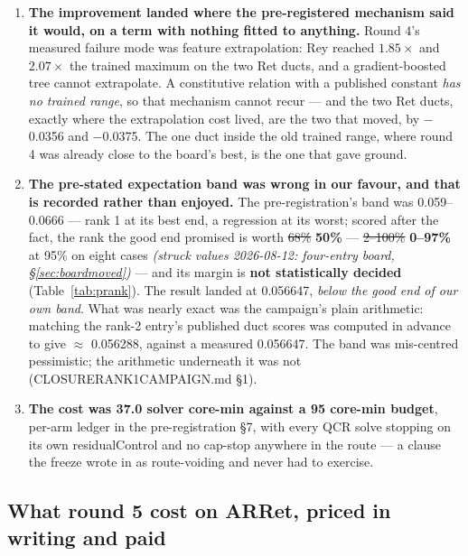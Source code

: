 \documentclass[11pt,a4paper]{article}
\newcommand{\breakus}{\textunderscore\allowbreak}
\newcommand{\code}[1]{{\small\ttfamily\let\_\breakus #1}}
\newcommand{\artifact}[1]{{\footnotesize\ttfamily\let\_\breakus #1}}
\begin{document}
\begin{enumerate}
\item \textbf{The improvement landed where the pre-registered mechanism said it would, on a
  term with nothing fitted to anything.} Round 4's measured failure mode was feature
  extrapolation: \code{Re\_y} reached $1.85\times$ and $2.07\times$ the trained maximum on
  the two \code{Ret\_360} ducts, and a gradient-boosted tree cannot extrapolate. A
  constitutive relation with a published constant \emph{has no trained range}, so that
  mechanism cannot recur --- and the two \code{Ret\_360} ducts, exactly where the
  extrapolation cost lived, are the two that moved, by $-$0.0356 and $-$0.0375. The one
  duct inside the old trained range, where round 4 was already close to the board's best,
  is the one that gave ground.
\item \textbf{The pre-stated expectation band was wrong in our favour, and that is recorded
  rather than enjoyed.} The pre-registration's band was 0.059--0.0666 --- rank 1 at its
  best end, a regression at its worst; scored after the fact, the rank the good end promised
  is worth \sout{68\%} \textbf{50\%} --- \sout{2--100\%} \textbf{0--97\%} at 95\% on eight
  cases \emph{(struck values 2026-08-12: four-entry board, \S\ref{sec:boardmoved})} --- and its margin is
  \textbf{not statistically decided} (Table~\ref{tab:prank}). The result landed at 0.056647, \emph{below the good
  end of our own band}. What was nearly exact was the campaign's plain arithmetic: matching
  the rank-2 entry's published duct scores was computed in advance to give $\approx$
  0.056288, against a measured 0.056647. The band was mis-centred pessimistic; the
  arithmetic underneath it was not (\artifact{CLOSURE\_RANK1\_CAMPAIGN.md} \S1).
\item \textbf{The cost was 37.0 solver core-min against a 95 core-min budget}, per-arm
  ledger in the pre-registration \S7, with every QCR solve stopping on its own
  \code{residualControl} and no cap-stop anywhere in the route --- a clause the freeze
  wrote in as route-voiding and never had to exercise.
\end{enumerate}

\subsection{What round 5 cost on \code{AR\_14\_Ret\_180}, priced in writing and paid}
\label{sec:ar14}
\end{document}

